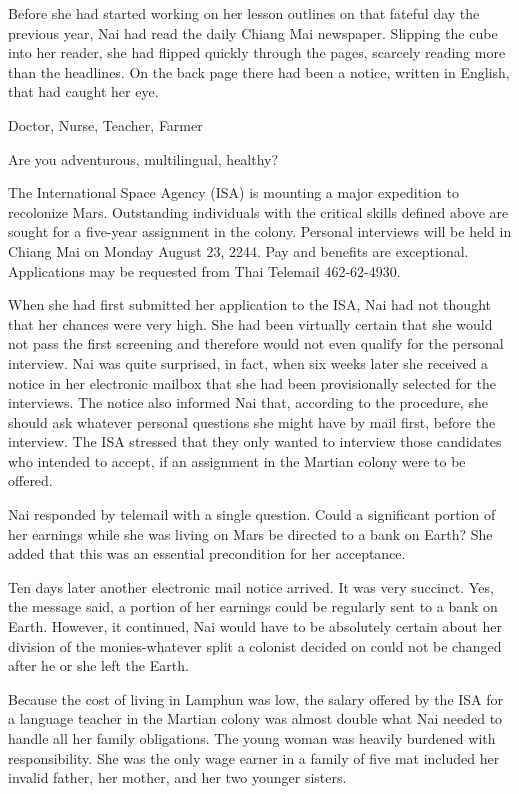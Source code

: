 \documentclass[]{article}
\begin{document}
{Before she had started working on her lesson outlines on that fateful day the previous year, Nai had read the daily Chiang Mai newspaper.  Slipping the cube into her reader, she had flipped quickly through the pages, scarcely reading more than the headlines.  On the back page there had been a notice, written in English, that had caught her eye.

Doctor, Nurse, Teacher, Farmer

Are you adventurous, multilingual, healthy?

The International Space Agency (ISA) is mounting a major expedition to recolonize Mars.  Outstanding individuals with the critical skills defined above are sought for a five-year assignment in the colony.  Personal interviews will be held in Chiang Mai on Monday August 23, 2244.  Pay and benefits are exceptional.  Applications may be requested from Thai Telemail  462-62-4930.

When she had first submitted her application to the ISA, Nai had not thought that her chances were very high.  She had been virtually certain that she would not pass the first screening and therefore would not even qualify for the personal interview.  Nai was quite surprised, in fact, when six weeks later she received a notice in her electronic mailbox that she had been provisionally selected for the interviews.  The notice also informed Nai that, according to the procedure, she should ask whatever personal questions she might have by mail first, before the interview.  The ISA stressed that they only wanted to interview those candidates who intended to accept, if an assignment in the Martian colony were to be offered.

Nai responded by telemail with a single question.  Could a significant portion of her earnings while she was living on Mars be directed to a bank on Earth? She added that this was an essential precondition for her acceptance.

Ten days later another electronic mail notice arrived.  It was very succinct.  Yes, the message said, a portion of her earnings could be regularly sent to a bank on Earth.  However, it continued, Nai would have to be absolutely certain about her division of the monies-whatever split a colonist decided on could not be changed after he or she left the Earth.

Because the cost of living in Lamphun was low, the salary offered by the ISA for a language teacher in the Martian colony was almost double what Nai needed to handle all her family obligations.  The young woman was heavily burdened with responsibility.  She was the only wage earner in a family of five mat included her invalid father, her mother, and her two younger sisters.

}
\end{document}
